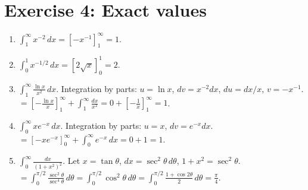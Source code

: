 \documentclass[12pt,a4paper]{article}
\begin{document}
\section*{Exercise 4: Exact values}

\begin{enumerate}[leftmargin=*, label=(\alph*)]

\item $\int_1^\infty x^{-2}\,dx=\left[-x^{-1}\right]_1^\infty=1$.

\item $\int_0^1 x^{-1/2}\,dx=\left[2\sqrt{x}\right]_0^1=2$.

\item $\int_1^\infty\frac{\ln x}{x^2}\,dx$. Integration by parts: $u=\ln x$, $dv=x^{-2}dx$, $du=dx/x$, $v=-x^{-1}$.
$=\left[-\frac{\ln x}{x}\right]_1^\infty+\int_1^\infty\frac{dx}{x^2}=0+\left[-\frac{1}{x}\right]_1^\infty=1$.

\item $\int_0^\infty xe^{-x}\,dx$. Integration by parts: $u=x$, $dv=e^{-x}dx$.
$=\left[-xe^{-x}\right]_0^\infty+\int_0^\infty e^{-x}\,dx=0+1=1$.

\item $\int_0^\infty\frac{dx}{(1+x^2)^2}$. Let $x=\tan\theta$, $dx=\sec^2\theta\,d\theta$, $1+x^2=\sec^2\theta$.
$=\int_0^{\pi/2}\frac{\sec^2\theta}{\sec^4\theta}\,d\theta=\int_0^{\pi/2}\cos^2\theta\,d\theta=\int_0^{\pi/2}\frac{1+\cos 2\theta}{2}\,d\theta=\frac{\pi}{4}$.

\end{enumerate}
\end{document}

